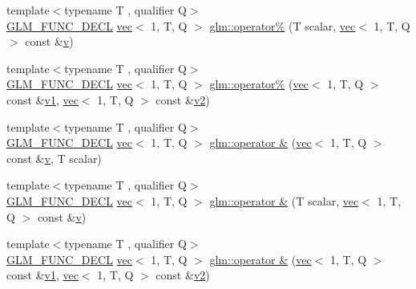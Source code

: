 \begin{DoxyCompactItemize}
\item 
{\footnotesize template$<$typename T , qualifier Q$>$ }\\\hyperlink{setup_8hpp_ab2d052de21a70539923e9bcbf6e83a51}{G\+L\+M\+\_\+\+F\+U\+N\+C\+\_\+\+D\+E\+CL} \hyperlink{structglm_1_1vec}{vec}$<$ 1, T, Q $>$ \hyperlink{group__ext__vec1_gafaa74182cb9679e2b23567fc4da42bf8}{glm\+::operator\%} (T scalar, \hyperlink{structglm_1_1vec}{vec}$<$ 1, T, Q $>$ const \&\hyperlink{_s_d_l__opengl_8h_a10a82eabcb59d2fcd74acee063775f90}{v})
\item 
{\footnotesize template$<$typename T , qualifier Q$>$ }\\\hyperlink{setup_8hpp_ab2d052de21a70539923e9bcbf6e83a51}{G\+L\+M\+\_\+\+F\+U\+N\+C\+\_\+\+D\+E\+CL} \hyperlink{structglm_1_1vec}{vec}$<$ 1, T, Q $>$ \hyperlink{group__ext__vec1_ga1a6ce0ed38acf01fa29b2ad451175496}{glm\+::operator\%} (\hyperlink{structglm_1_1vec}{vec}$<$ 1, T, Q $>$ const \&\hyperlink{_s_d_l__opengl__glext_8h_a435c176a02c061b43e19bdf7c86cceae}{v1}, \hyperlink{structglm_1_1vec}{vec}$<$ 1, T, Q $>$ const \&\hyperlink{_s_d_l__opengl__glext_8h_a0928f6d0f0f794ba000a21dfae422136}{v2})
\item 
{\footnotesize template$<$typename T , qualifier Q$>$ }\\\hyperlink{setup_8hpp_ab2d052de21a70539923e9bcbf6e83a51}{G\+L\+M\+\_\+\+F\+U\+N\+C\+\_\+\+D\+E\+CL} \hyperlink{structglm_1_1vec}{vec}$<$ 1, T, Q $>$ \hyperlink{group__ext__vec1_ga62a75b0dadc3e908b03bf03bee891e6d}{glm\+::operator \&} (\hyperlink{structglm_1_1vec}{vec}$<$ 1, T, Q $>$ const \&\hyperlink{_s_d_l__opengl_8h_a10a82eabcb59d2fcd74acee063775f90}{v}, T scalar)
\item 
{\footnotesize template$<$typename T , qualifier Q$>$ }\\\hyperlink{setup_8hpp_ab2d052de21a70539923e9bcbf6e83a51}{G\+L\+M\+\_\+\+F\+U\+N\+C\+\_\+\+D\+E\+CL} \hyperlink{structglm_1_1vec}{vec}$<$ 1, T, Q $>$ \hyperlink{group__ext__vec1_ga6637b42fbf149b977ce3f66571be212a}{glm\+::operator \&} (T scalar, \hyperlink{structglm_1_1vec}{vec}$<$ 1, T, Q $>$ const \&\hyperlink{_s_d_l__opengl_8h_a10a82eabcb59d2fcd74acee063775f90}{v})
\item 
{\footnotesize template$<$typename T , qualifier Q$>$ }\\\hyperlink{setup_8hpp_ab2d052de21a70539923e9bcbf6e83a51}{G\+L\+M\+\_\+\+F\+U\+N\+C\+\_\+\+D\+E\+CL} \hyperlink{structglm_1_1vec}{vec}$<$ 1, T, Q $>$ \hyperlink{group__ext__vec1_ga9f942c4c4e896e42f1810824f7af294b}{glm\+::operator \&} (\hyperlink{structglm_1_1vec}{vec}$<$ 1, T, Q $>$ const \&\hyperlink{_s_d_l__opengl__glext_8h_a435c176a02c061b43e19bdf7c86cceae}{v1}, \hyperlink{structglm_1_1vec}{vec}$<$ 1, T, Q $>$ const \&\hyperlink{_s_d_l__opengl__glext_8h_a0928f6d0f0f794ba000a21dfae422136}{v2})

\end{DoxyCompactItemize}
